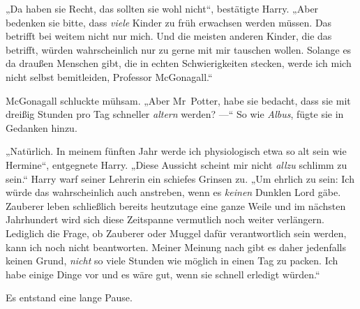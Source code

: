 „Da haben sie Recht, das sollten sie wohl nicht“, bestätigte Harry.
„Aber bedenken sie bitte, dass \emph{viele} Kinder zu früh erwachsen werden müssen. Das betrifft bei weitem nicht nur mich. Und die meisten anderen Kinder, die das betrifft, würden wahrscheinlich nur zu gerne mit mir tauschen wollen. Solange es da draußen Menschen gibt, die in echten Schwierigkeiten stecken, werde ich mich nicht selbst bemitleiden, Professor McGonagall.“

McGonagall schluckte mühsam.
„Aber Mr~Potter, habe sie bedacht, dass sie mit dreißig Stunden pro Tag schneller \emph{altern} werden? —“ So wie \emph{Albus}, fügte sie in Gedanken hinzu.

„Natürlich. In meinem fünften Jahr werde ich physiologisch etwa so alt sein wie Hermine“, entgegnete Harry.
„Diese Aussicht scheint mir nicht \emph{allzu} schlimm zu sein.“ Harry warf seiner Lehrerin ein schiefes Grinsen zu.
„Um ehrlich zu sein: Ich würde das wahrscheinlich auch anstreben, wenn es \emph{keinen} Dunklen Lord gäbe. Zauberer leben schließlich bereits heutzutage eine ganze Weile und im nächsten Jahrhundert wird sich diese Zeitspanne vermutlich noch weiter verlängern. Lediglich die Frage, ob Zauberer oder Muggel dafür verantwortlich sein werden, kann ich noch nicht beantworten. Meiner Meinung nach gibt es daher jedenfalls keinen Grund, \emph{nicht} so viele Stunden wie möglich in einen Tag zu packen. Ich habe einige Dinge vor und es wäre gut, wenn sie schnell erledigt würden.“

Es entstand eine lange Pause.

